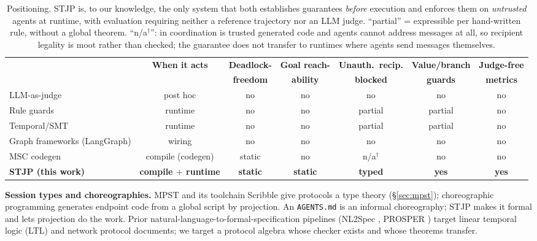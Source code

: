 \documentclass{article}
\newcommand{\stjp}{\textsc{STJP}}
\begin{document}
\begin{table}[t]
\centering\small
\caption{Positioning. \stjp{} is, to our knowledge, the only system that both establishes guarantees \emph{before} execution and enforces them on \emph{untrusted} agents at runtime, with evaluation requiring neither a reference trajectory nor an LLM judge. ``partial'' = expressible per hand-written rule, without a global theorem. ``n/a$^{\dagger}$'': in \citet{bollig26} coordination is trusted generated code and agents cannot address messages at all, so recipient legality is moot rather than checked; the guarantee does not transfer to runtimes where agents send messages themselves.}
\label{tab:position}
\begin{tabular}{@{}lcccccc@{}}
\toprule
& \textbf{When it acts} & \textbf{Deadlock-} & \textbf{Goal reach-} & \textbf{Unauth.\ recip.} & \textbf{Value/branch} & \textbf{Judge-free} \\
& & \textbf{freedom} & \textbf{ability} & \textbf{blocked} & \textbf{guards} & \textbf{metrics} \\
\midrule
LLM-as-judge & post hoc & no & no & no & no & no \\
Rule guards \citep{agentspec} & runtime & no & no & partial & partial & no \\
Temporal/SMT \citep{agentc} & runtime & no & no & partial & partial & no \\
Graph frameworks (LangGraph) & wiring & no & no & no & no & no \\
MSC codegen \citep{bollig26} & compile (codegen) & static & no & n/a$^{\dagger}$ & no & no \\
\textbf{\stjp{} (this work)} & \textbf{compile $+$ runtime} & \textbf{static} & \textbf{static} & \textbf{typed} & \textbf{yes} & \textbf{yes} \\
\bottomrule
\end{tabular}
\end{table}

\textbf{Session types and choreographies.} MPST \citep{hyc08,scalas19} and its toolchain Scribble \citep{scribble} give protocols a type theory (\S\ref{sec:mpst}); choreographic programming \citep{montesi23,carbone13} generates endpoint code from a global script by projection. An \texttt{AGENTS.md} is an informal choreography; \stjp{} makes it formal and lets projection do the work. Prior natural-language-to-formal-specification pipelines (NL2Spec \citep{nl2spec}, PROSPER \citep{prosper}) target linear temporal logic (LTL) and network protocol documents; we target a protocol algebra whose checker exists and whose theorems transfer.
\end{document}
